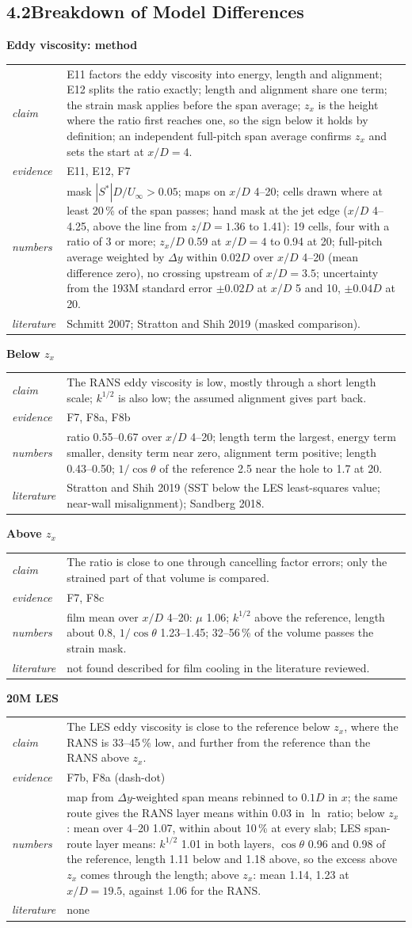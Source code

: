 \documentclass[10pt]{article}
\makeatletter
\newcommand{\blk}[5]{\textbf{#1}\par
\begin{tabularx}{\textwidth}{@{}>{\itshape}l X@{}}
claim & #2\\ evidence & #3\\ numbers & #4\\ literature & #5\\
\end{tabularx}\par\smallskip}
\makeatother
\begin{document}
\subsection*{4.2\quad Breakdown of Model Differences}

\blk{Eddy viscosity: method}{E11 factors the eddy viscosity into energy, length and alignment; E12 splits the
ratio exactly; length and alignment share one term; the strain mask applies before the span average; $z_x$ is the
height where the ratio first reaches one, so the sign below it holds by definition; an independent full-pitch span
average confirms $z_x$ and sets the start at $x/D=4$.}{E11, E12, F7}{mask $|S^*|D/U_\infty>0.05$; maps on $x/D$
4--20; cells drawn where at least 20\,\% of the span passes; hand mask at the jet edge ($x/D$ 4--4.25, above the
line from $z/D=1.36$ to 1.41): 19 cells, four with a ratio of 3 or more; $z_x/D$ 0.59 at $x/D=4$ to 0.94 at 20; full-pitch
average weighted by $\Delta y$ within $0.02D$ over $x/D$ 4--20 (mean difference zero), no crossing upstream of
$x/D=3.5$; uncertainty from the 193M standard error $\pm0.02D$ at $x/D$ 5 and 10, $\pm0.04D$ at 20.}{Schmitt 2007;
Stratton and Shih 2019 (masked comparison).}

\blk{Below $z_x$}{The RANS eddy viscosity is low, mostly through a short length scale; $k^{1/2}$ is also low; the
assumed alignment gives part back.}{F7, F8a, F8b}{ratio 0.55--0.67 over $x/D$ 4--20; length term the largest,
energy term smaller, density term near zero, alignment term positive; length 0.43--0.50; $1/\cos\theta$ of the reference 2.5 near the hole
to 1.7 at 20.}{Stratton and Shih 2019 (SST below the LES least-squares value; near-wall misalignment); Sandberg
2018.}

\blk{Above $z_x$}{The ratio is close to one through cancelling factor errors; only the strained part of that volume
is compared.}{F7, F8c}{film mean over $x/D$ 4--20: $\mu$ 1.06; $k^{1/2}$ above the reference, length about 0.8,
$1/\cos\theta$ 1.23--1.45; 32--56\,\% of the volume passes the strain mask.}{not found described for film cooling in the
literature reviewed.}

\blk{20M LES}{The LES eddy viscosity is close to the reference below $z_x$, where the RANS is 33--45\,\% low, and
further from the reference than the RANS above $z_x$.}{F7b, F8a (dash-dot)}{map from $\Delta y$-weighted span means
rebinned to $0.1D$ in $x$; the same route gives the RANS layer means within 0.03 in $\ln$ ratio; below $z_x$: mean
over 4--20 1.07, within about 10\,\% at every slab; LES span-route layer means: $k^{1/2}$ 1.01 in both layers, $\cos\theta$ 0.96
and 0.98 of the reference, length 1.11 below and 1.18 above, so the excess above $z_x$ comes through the length;
above $z_x$: mean 1.14, 1.23 at $x/D=19.5$, against 1.06 for
the RANS.}{none}
\end{document}
